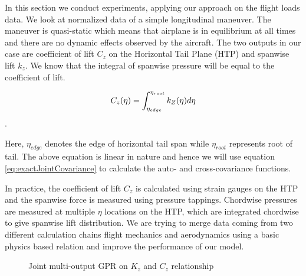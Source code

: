 In this section we conduct experiments, applying our approach on the flight loads data. We look at normalized data of a simple longitudinal maneuver. The maneuver is quasi-static which means that airplane is in equilibrium at all times and there are no dynamic effects observed by the aircraft. The two outputs in our case are coefficient of lift \(C_{z}\) on the Horizontal Tail Plane (HTP) and spanwise lift \(k_{z}\). We know that the integral of spanwise pressure will be equal to the coefficient of lift.

\begin{equation}\label{eq:relationCzKz}
\centering
C_{z}(\eta) = \int_{\eta_{edge}}^{\eta_{root}} k_{Z}(\eta)d\eta
\end{equation}.

Here, \(\eta_{edge}\) denotes the edge of horizontal tail span while \(\eta_{root}\) represents root of tail. The above equation is linear in nature and hence we will use equation \ref{eq:exactJointCovariance} to calculate the auto- and cross-covariance functions.

In practice, the coefficient of lift \(C_{z}\) is calculated using strain gauges on the HTP and the spanwise force is measured using pressure tappings. Chordwise pressures are measured at multiple \(\eta\) locations on the HTP, which are integrated chordwise to give spanwise lift distribution. We are trying to merge data coming from two different calculation chains flight mechanics and aerodynamics using a basic physics based relation and improve the performance of our model.

\begin{figure}[!ht]
  \centering
  \quad
  
  \caption{Joint multi-output GPR on  \(K_{z}\) and \(C_{z}\) relationship}\label{fig:cztzRelationship}
\end{figure}



